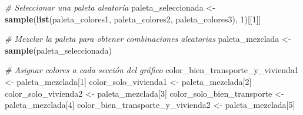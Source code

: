 \documentclass[
]{article}
\newenvironment{Shaded}{\begin{snugshade}}{\end{snugshade}}
\newcommand{\CommentTok}[1]{\textcolor[rgb]{0.56,0.35,0.01}{\textit{#1}}}
\newcommand{\DecValTok}[1]{\textcolor[rgb]{0.00,0.00,0.81}{#1}}
\newcommand{\FunctionTok}[1]{\textcolor[rgb]{0.13,0.29,0.53}{\textbf{#1}}}
\newcommand{\NormalTok}[1]{#1}
\newcommand{\OtherTok}[1]{\textcolor[rgb]{0.56,0.35,0.01}{#1}}
\begin{document}
\begin{Shaded}
\begin{Highlighting}[]
\CommentTok{\# Seleccionar una paleta aleatoria}
\NormalTok{paleta\_seleccionada }\OtherTok{\textless{}{-}} \FunctionTok{sample}\NormalTok{(}\FunctionTok{list}\NormalTok{(paleta\_colores1, paleta\_colores2, paleta\_colores3), }\DecValTok{1}\NormalTok{)[[}\DecValTok{1}\NormalTok{]]}

\CommentTok{\# Mezclar la paleta para obtener combinaciones aleatorias}
\NormalTok{paleta\_mezclada }\OtherTok{\textless{}{-}} \FunctionTok{sample}\NormalTok{(paleta\_seleccionada)}

\CommentTok{\# Asignar colores a cada sección del gráfico}
\NormalTok{color\_bien\_transporte\_y\_vivienda1 }\OtherTok{\textless{}{-}}\NormalTok{ paleta\_mezclada[}\DecValTok{1}\NormalTok{]}
\NormalTok{color\_solo\_vivienda1 }\OtherTok{\textless{}{-}}\NormalTok{ paleta\_mezclada[}\DecValTok{2}\NormalTok{]}
\NormalTok{color\_solo\_vivienda2 }\OtherTok{\textless{}{-}}\NormalTok{ paleta\_mezclada[}\DecValTok{3}\NormalTok{]}
\NormalTok{color\_solo\_bien\_transporte }\OtherTok{\textless{}{-}}\NormalTok{ paleta\_mezclada[}\DecValTok{4}\NormalTok{]}
\NormalTok{color\_bien\_transporte\_y\_vivienda2 }\OtherTok{\textless{}{-}}\NormalTok{ paleta\_mezclada[}\DecValTok{5}\NormalTok{]}
\end{Highlighting}
\end{Shaded}
\end{document}
